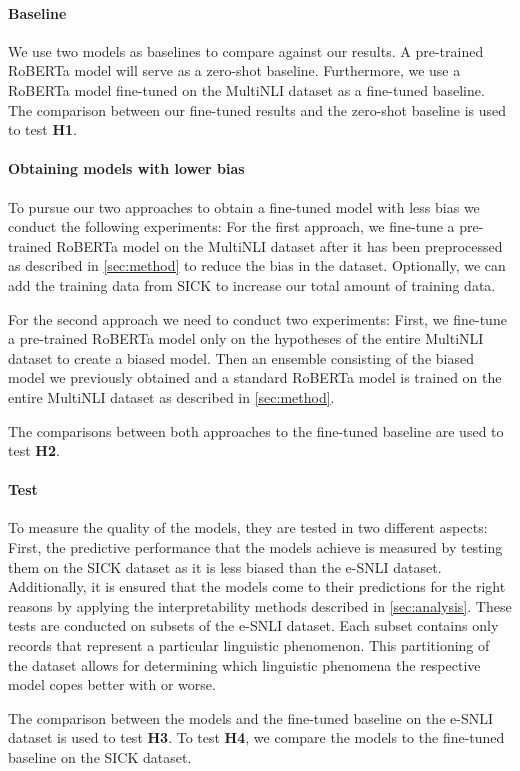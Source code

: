 \paragraph{Baseline}
We use two models as baselines to compare against our results. A pre-trained \ac{RoBERTa} model will serve as a zero-shot baseline. Furthermore, we use a \ac{RoBERTa} model fine-tuned on the \ac{MultiNLI} dataset as a fine-tuned baseline. The comparison between our fine-tuned results and the zero-shot baseline is used to test \textbf{H1}.

\paragraph{Obtaining models with lower bias}
To pursue our two approaches to obtain a fine-tuned model with less bias we conduct the following experiments: For the first approach, we fine-tune a pre-trained \ac{RoBERTa} model on the \ac{MultiNLI} dataset after it has been preprocessed as described in \autoref{sec:method} to reduce the bias in the dataset. Optionally, we can add the training data from \ac{SICK} to increase our total amount of training data.

For the second approach we need to conduct two experiments: First, we fine-tune a pre-trained \ac{RoBERTa} model only on the hypotheses of the entire \ac{MultiNLI} dataset to create a biased model. Then an ensemble consisting of the biased model we previously obtained and a standard \ac{RoBERTa} model is trained on the entire \ac{MultiNLI} dataset as described in \autoref{sec:method}.

The comparisons between both approaches to the fine-tuned baseline are used to test \textbf{H2}.

\paragraph{Test}
To measure the quality of the models, they are tested in two different aspects: First, the predictive performance that the models achieve is measured by testing them on the SICK dataset as it is less biased than the \ac{e-SNLI} dataset. Additionally, it is ensured that the models come to their predictions for the right reasons by applying the interpretability methods described in \autoref{sec:analysis}. These tests are conducted on subsets of the \ac{e-SNLI} dataset. Each subset contains only records that represent a particular linguistic phenomenon. This partitioning of the dataset allows for determining which linguistic phenomena the respective model copes better with or worse.

The comparison between the models and the fine-tuned baseline on the \ac{e-SNLI} dataset is used to test \textbf{H3}. To test \textbf{H4}, we compare the models to the fine-tuned baseline on the \ac{SICK} dataset.
